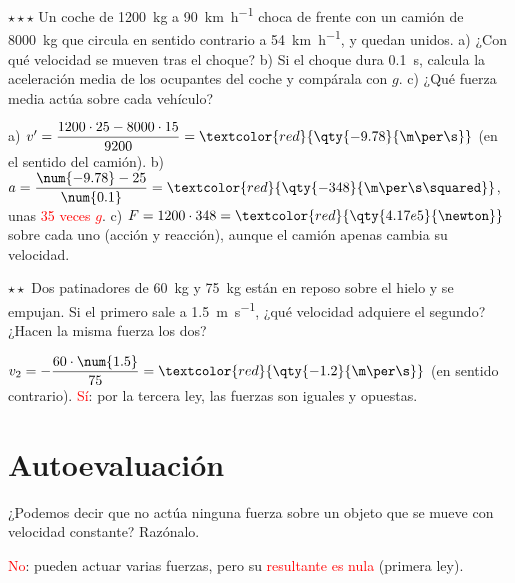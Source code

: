 \begin{exercise}
    \(\star\star\star\) Un coche de \qty{1200}{\kg} a \qty{90}{\km\per\hour} choca de frente con un camión de \qty{8000}{\kg} que
    circula en sentido contrario a \qty{54}{\km\per\hour}, y quedan unidos. a) ¿Con qué velocidad se mueven tras el choque? b) Si el
    choque dura \qty{0.1}{\s}, calcula la aceleración media de los ocupantes del coche y compárala con \(g\). c) ¿Qué fuerza media
    actúa sobre cada vehículo?
    \begin{solu}
        a) \(v' = \dfrac{1200 \cdot 25 - 8000 \cdot 15}{9200} = \textcolor{red}{\qty{-9.78}{\m\per\s}}\) (en el sentido del camión).
        b) \(a = \dfrac{\num{-9.78} - 25}{\num{0.1}} = \textcolor{red}{\qty{-348}{\m\per\s\squared}}\), unas \textcolor{red}{35 veces
        \(g\)}. c) \(F = 1200 \cdot 348 = \textcolor{red}{\qty{4.17e5}{\newton}}\) sobre cada uno (acción y reacción), aunque el
        camión apenas cambia su velocidad.
    \end{solu}
\end{exercise}

\begin{exercise}
    \(\star\star\) Dos patinadores de \qty{60}{\kg} y \qty{75}{\kg} están en reposo sobre el hielo y se empujan. Si el primero sale a
    \qty{1.5}{\m\per\s}, ¿qué velocidad adquiere el segundo? ¿Hacen la misma fuerza los dos?
    \begin{solu}
        \(v_2 = -\dfrac{60 \cdot \num{1.5}}{75} = \textcolor{red}{\qty{-1.2}{\m\per\s}}\) (en sentido contrario).
        \textcolor{red}{Sí}: por la tercera ley, las fuerzas son iguales y opuestas.
    \end{solu}
\end{exercise}

\section{Autoevaluación}\label{sec:ud10-autoevaluacion}

\begin{exercise}
    ¿Podemos decir que no actúa ninguna fuerza sobre un objeto que se mueve con velocidad constante? Razónalo.
    \begin{solu}
        \textcolor{red}{No}: pueden actuar varias fuerzas, pero su \textcolor{red}{resultante es nula} (primera ley).
    \end{solu}
\end{exercise}

